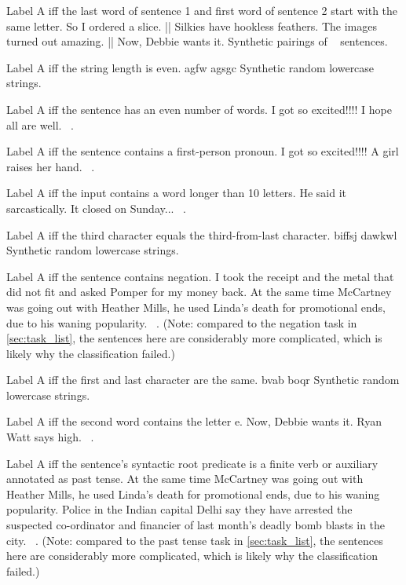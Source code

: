 \documentclass[11pt, letterpaper]{article}
\begin{document}
{Label A iff the last word of sentence 1 and first word of sentence 2 start with the same letter.}
{So I ordered a slice. || Silkies have hookless feathers.}
{The images turned out amazing. || Now, Debbie wants it.}
{Synthetic pairings of ~\cite{silveira-etal-2014} sentences.}

{Label A iff the string length is even.}
{agfw}
{agsgc}
{Synthetic random lowercase strings.}

{Label A iff the sentence has an even number of words.}
{I got so excited!!!!}
{I hope all are well.}
{~\cite{silveira-etal-2014}.}

{Label A iff the sentence contains a first-person pronoun.}
{I got so excited!!!!}
{A girl raises her hand.}
{~\cite{silveira-etal-2014}.}

{Label A iff the input contains a word longer than 10 letters.}
{He said it sarcastically.}
{It closed on Sunday...}
{~\cite{silveira-etal-2014}.}

{Label A iff the third character equals the third-from-last character.}
{biffsj}
{dawkwl}
{Synthetic random lowercase strings.}

{Label A iff the sentence contains negation.}
{I took the receipt and the metal that did not fit and asked Pomper for my money back.}
{At the same time McCartney was going out with Heather Mills, he used Linda's death for promotional ends, due to his waning popularity.}
{~\cite{silveira-etal-2014}. (Note: compared to the negation task in \cref{sec:task_list}, the sentences here are considerably more complicated, which is likely why the classification failed.)}

{Label A iff the first and last character are the same.}
{bvab}
{boqr}
{Synthetic random lowercase strings.}

{Label A iff the second word contains the letter e.}
{Now, Debbie wants it.}
{Ryan Watt says high.}
{~\cite{silveira-etal-2014}.}

{Label A iff the sentence's syntactic root predicate is a finite verb or auxiliary annotated as past tense.}
{At the same time McCartney was going out with Heather Mills, he used Linda's death for promotional ends, due to his waning popularity.}
{Police in the Indian capital Delhi say they have arrested the suspected co-ordinator and financier of last month's deadly bomb blasts in the city.}
{~\cite{silveira-etal-2014}. (Note: compared to the past tense task in \cref{sec:task_list}, the sentences here are considerably more complicated, which is likely why the classification failed.)}
\end{document}
